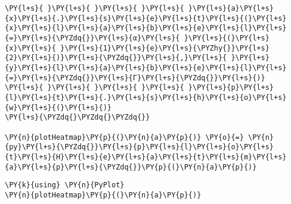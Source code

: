 \documentclass[main.tex]{subfiles}
\begin{document}
\begin{tcolorbox}[breakable, size=fbox, boxrule=1pt, pad at break*=1mm,colback=cellbackground, colframe=cellborder]
\begin{Verbatim}[commandchars=\\\{\}]
\PY{l+s}{ }\PY{l+s}{ }\PY{l+s}{ }\PY{l+s}{ }\PY{l+s}{a}\PY{l+s}{x}\PY{l+s}{.}\PY{l+s}{s}\PY{l+s}{e}\PY{l+s}{t}\PY{l+s}{(}\PY{l+s}{x}\PY{l+s}{l}\PY{l+s}{a}\PY{l+s}{b}\PY{l+s}{e}\PY{l+s}{l}\PY{l+s}{=}\PY{l+s}{\PYZdq{}}\PY{l+s}{α}\PY{l+s}{ }\PY{l+s}{(}\PY{l+s}{x}\PY{l+s}{ }\PY{l+s}{1}\PY{l+s}{e}\PY{l+s}{\PYZhy{}}\PY{l+s}{2}\PY{l+s}{)}\PY{l+s}{\PYZdq{}}\PY{l+s}{,}\PY{l+s}{ }\PY{l+s}{y}\PY{l+s}{l}\PY{l+s}{a}\PY{l+s}{b}\PY{l+s}{e}\PY{l+s}{l}\PY{l+s}{=}\PY{l+s}{\PYZdq{}}\PY{l+s}{Γ}\PY{l+s}{\PYZdq{}}\PY{l+s}{)}
\PY{l+s}{ }\PY{l+s}{ }\PY{l+s}{ }\PY{l+s}{ }\PY{l+s}{p}\PY{l+s}{l}\PY{l+s}{t}\PY{l+s}{.}\PY{l+s}{s}\PY{l+s}{h}\PY{l+s}{o}\PY{l+s}{w}\PY{l+s}{(}\PY{l+s}{)}
\PY{l+s}{\PYZdq{}\PYZdq{}\PYZdq{}}

\PY{n}{plotHeatmap}\PY{p}{(}\PY{n}{a}\PY{p}{)} \PY{o}{=} \PY{n}{py}\PY{l+s}{\PYZdq{}}\PY{l+s}{p}\PY{l+s}{l}\PY{l+s}{o}\PY{l+s}{t}\PY{l+s}{H}\PY{l+s}{e}\PY{l+s}{a}\PY{l+s}{t}\PY{l+s}{m}\PY{l+s}{a}\PY{l+s}{p}\PY{l+s}{\PYZdq{}}\PY{p}{(}\PY{n}{a}\PY{p}{)}
\end{Verbatim}
\end{tcolorbox}

    \begin{tcolorbox}[breakable, size=fbox, boxrule=1pt, pad at break*=1mm,colback=cellbackground, colframe=cellborder]
\begin{Verbatim}[commandchars=\\\{\}]
\PY{k}{using} \PY{n}{PyPlot}
\PY{n}{plotHeatmap}\PY{p}{(}\PY{n}{a}\PY{p}{)}
\end{Verbatim}
\end{tcolorbox}
\end{document}
